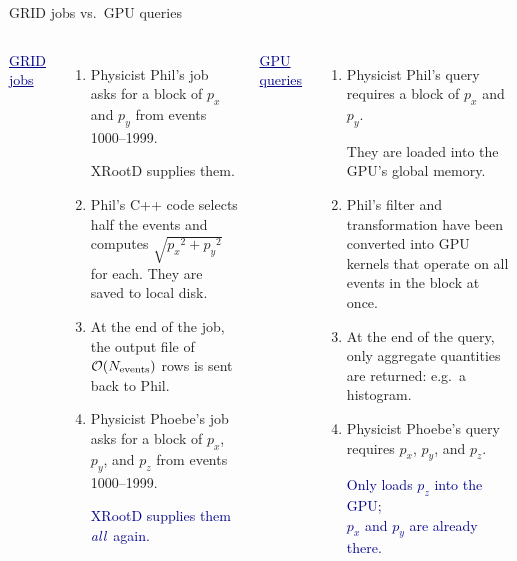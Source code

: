 \documentclass{beamer}
\begin{document}
\begin{frame}{GRID jobs vs.\ GPU queries}
\vspace{0.25 cm}
\small
\begin{columns}[t]
\textcolor{darkblue}{\underline{GRID jobs}}
\begin{enumerate}
\item Physicist Phil's job asks for a block of $p_x$ and $p_y$ from events 1000--1999.

XRootD supplies them.

\item Phil's C++ code selects half the events and computes $\sqrt{{p_x}^2 + {p_y}^2}$ for each. They are saved to local disk.

\item At the end of the job, the output file of $\mathcal{O}(N_{\mbox{\scriptsize events}})$ rows is sent back to Phil.

\item Physicist Phoebe's job asks for a block of $p_x$, $p_y$, and $p_z$ from events 1000--1999.

\textcolor{darkblue}{XRootD supplies them \mbox{{\it all} again.\hspace{-1 cm}}}
\end{enumerate}

\textcolor{darkblue}{\underline{GPU queries}}
\begin{enumerate}
\item Physicist Phil's query requires a block of $p_x$ and $p_y$.

They are loaded into the GPU's global memory.

\item Phil's filter and transformation have been converted into GPU kernels that operate on all events in the block at once.

\item At the end of the query, only aggregate quantities are returned: e.g.\ a histogram.

\item Physicist Phoebe's query requires $p_x$, $p_y$, and $p_z$.

\textcolor{darkblue}{Only loads $p_z$ into the GPU; \\ $p_x$ and $p_y$ are already there.}
\end{enumerate}
\end{columns}
\end{frame}
\end{document}

